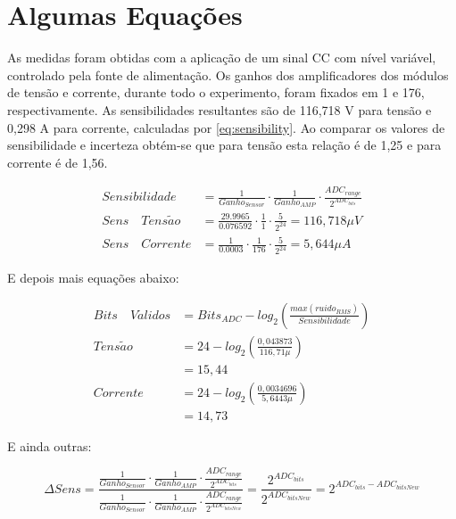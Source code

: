 	\section{Algumas Equações}

		As medidas foram obtidas com a aplicação de um sinal CC com nível variável, controlado pela fonte de alimentação. Os ganhos dos amplificadores dos módulos de tensão e corrente, durante todo o experimento, foram fixados em 1 e 176, respectivamente. As sensibilidades resultantes são de 116,718 V para tensão e 0,298 A para corrente, calculadas por \eqref{eq:sensibility}. Ao comparar os valores de sensibilidade e incerteza obtém-se que para tensão esta relação é de 1,25 e para corrente é de 1,56.
		
		\begin{align}
		\label{eq:sensibility}
		Sensibilidade &= \frac{1}{Ganho_{Sensor}} \cdot \frac{1}{Ganho_{AMP}} \cdot \frac{ADC_{range}}{2^{ADC_{bits}}}	\\[24pt]
		Sens\quad Tens\tilde{a}o &= \frac{29.9965}{0.076592} \cdot \frac{1}{1} \cdot \frac{5}{2^{24}} = 116,718\mu V		\\[24pt]
		Sens\quad Corrente &= \frac{1}{0.0003} \cdot \frac{1}{176} \cdot \frac{5}{2^{24}} = 5,644\mu A
		\end{align}

		E depois mais equações abaixo:

		\begin{align}
		Bits\quad V\acute{a}lidos &= Bits_{ADC} - log_2\left(\frac{max(ruido_{RMS})}{Sensibilidade}\right)	\label{eq:validbits}	\\[12pt]
		Tens\tilde{a}o 			&= 24 - log_2\left(\frac{0,043873}{116,71\mu}\right) \\
		&= 15,44	\label{eq:voltbits}						\\[12pt]
		Corrente				&= 24 - log_2\left(\frac{0,0034696}{5,6443\mu}\right) \\
		&= 14,73	\label{eq:currbits}
		\end{align}

		E ainda outras:

		\begin{equation}
		\label{eq:sensgain}
		\Delta Sens = \frac{\frac{1}{Ganho_{Sensor}} \cdot \frac{1}{Ganho_{AMP}} \cdot \frac{ADC_{range}}{2^{ADC_{bits}}}}{\frac{1}{Ganho_{Sensor}} \cdot \frac{1}{Ganho_{AMP}} \cdot \frac{ADC_{range}}{2^{ADC_{bitsNew}}}} = \frac{2^{ADC_{bits}}}{2^{ADC_{bitsNew}}} = 2^{ADC_{bits} - ADC_{bitsNew}}
		\end{equation}

